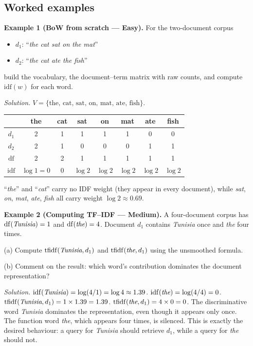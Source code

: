 \documentclass[12pt,a4paper]{report}
\theoremstyle{definition}
\theoremstyle{remark}
\begin{document}
\subsection{Worked examples}

\textbf{Example 1 (BoW from scratch --- Easy).}
For the two-document corpus
\begin{itemize}
    \item $d_1$: ``\emph{the cat sat on the mat}''
    \item $d_2$: ``\emph{the cat ate the fish}''
\end{itemize}
build the vocabulary, the document--term matrix with raw counts, and compute $\mathrm{idf}(w)$ for each word.

\textit{Solution.} $V = \{\text{the, cat, sat, on, mat, ate, fish}\}$.
\begin{center}
\begin{tabular}{|c|ccccccc|}
\hline
& the & cat & sat & on & mat & ate & fish \\
\hline
$d_1$ & 2 & 1 & 1 & 1 & 1 & 0 & 0 \\
$d_2$ & 2 & 1 & 0 & 0 & 0 & 1 & 1 \\
\hline
$\mathrm{df}$ & 2 & 2 & 1 & 1 & 1 & 1 & 1 \\
$\mathrm{idf}$ & $\log 1=0$ & $0$ & $\log 2$ & $\log 2$ & $\log 2$ & $\log 2$ & $\log 2$ \\
\hline
\end{tabular}
\end{center}
``\emph{the}'' and ``\emph{cat}'' carry no IDF weight (they appear in every document), while \emph{sat}, \emph{on}, \emph{mat}, \emph{ate}, \emph{fish} all carry weight $\log 2 \approx 0.69$.

\medskip

\textbf{Example 2 (Computing TF--IDF --- Medium).}
A four-document corpus has $\mathrm{df}(\emph{Tunisia}) = 1$ and $\mathrm{df}(\emph{the}) = 4$. Document $d_1$ contains \emph{Tunisia} once and \emph{the} four times.

(a) Compute $\mathrm{tfidf}(\emph{Tunisia}, d_1)$ and $\mathrm{tfidf}(\emph{the}, d_1)$ using the unsmoothed formula.

(b) Comment on the result: which word's contribution dominates the document representation?

\textit{Solution.}
$\mathrm{idf}(\emph{Tunisia}) = \log(4/1) = \log 4 \approx 1.39$. $\mathrm{idf}(\emph{the}) = \log(4/4) = 0$.
$\mathrm{tfidf}(\emph{Tunisia}, d_1) = 1 \times 1.39 = 1.39$. $\mathrm{tfidf}(\emph{the}, d_1) = 4 \times 0 = 0$.
The discriminative word \emph{Tunisia} dominates the representation, even though it appears only once. The function word \emph{the}, which appears four times, is silenced. This is exactly the desired behaviour: a query for \emph{Tunisia} should retrieve $d_1$, while a query for \emph{the} should not.
\end{document}
